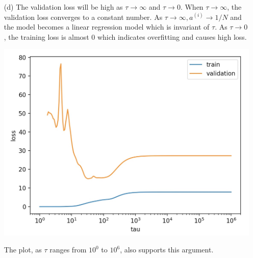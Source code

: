 \documentclass[12pt]{article}
\begin{document}
\begin{enumerate}
\begin{enumerate}
\begin{center}
      \end{center}
      \item[(d)] The validation loss will be high as $\tau \rightarrow \infty$ and $\tau \rightarrow 0.$ When $\tau \rightarrow \infty$, the validation loss converges to a constant number.
      As $\tau \rightarrow \infty , a^{(i)} \rightarrow 1/N$ and the model becomes a linear regression model which is invariant of $\tau$.
      As $\tau \rightarrow 0$, the training loss is almost 0 which indicates overfitting and causes high loss.
      \begin{center}
        \includegraphics[scale=0.3]{q4d.jpg}
      \end{center}
      The plot, as $\tau$ ranges from $10^0$ to $10^6$, also supports this argument.
  \end{enumerate}
  \end{enumerate}
\end{document}
